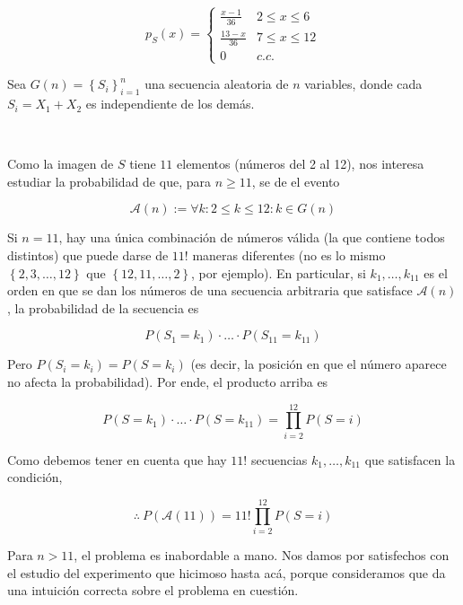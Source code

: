 \documentclass[a4paper, 12pt]{article}
\begin{document}
\begin{equation*}
  p_S(x) = \begin{cases}
    \frac{x-1}{36} &2 \leq x \leq 6 \\ 
    \frac{13-x}{36} &7 \leq x \leq 12 \\ 
    0 &c.c.
  \end{cases}
\end{equation*}

Sea $G(n) = \left\{ S_i\right\}_{i=1}^n $ una secuencia aleatoria
de $n$ variables, donde cada $S_i = X_1 + X_2$ es independiente de los demás.

~

Como la imagen de $S$ tiene $11$ elementos (números del 2 al 12), nos interesa
estudiar la probabilidad de que, para $n \geq 11$, se de el evento 

\begin{equation*}
  \mathcal{A}(n) := \forall k : 2 \leq k \leq 12 : k \in G(n)
\end{equation*}

Si $n = 11$, hay una única combinación de números válida (la que contiene todos distintos) que puede darse de $11!$ maneras diferentes (no es lo mismo $\left\{
2, 3, \ldots, 12\right\} $ que $\left\{ 12, 11, \ldots, 2 \right\} $, por
ejemplo). En particular, si $k_1, \ldots, k_{11}$ es el orden en que se dan los
números de una secuencia arbitraria que satisface $\mathcal{A}(n)$, la
probabilidad de la secuencia es 

\begin{equation*}
  P(S_1 = k_1) \cdot \ldots \cdot P(S_{11} = k_{11})
\end{equation*}

Pero $P(S_i = k_i) = P(S = k_i)$ (es decir, la posición en que el número aparece
no afecta la probabilidad). Por ende, el producto arriba es 


\begin{equation*}
  P(S = k_1) \cdot \ldots \cdot P(S = k_{11}) = \prod_{i=2}^{12}P(S = i)
\end{equation*}

Como debemos tener en cuenta que hay $11!$ secuencias $k_1, \ldots, k_{11}$ que
satisfacen la condición, 

\begin{equation*}
  \therefore ~ P(\mathcal{A}(11)) = 11! \prod_{i=2}^{12}P(S = i)
\end{equation*}

Para $n > 11$, el problema es inabordable a mano. Nos damos por satisfechos con el
estudio del experimento que hicimoso hasta acá, porque consideramos que da una
intuición correcta sobre el problema en cuestión.
\end{document}
